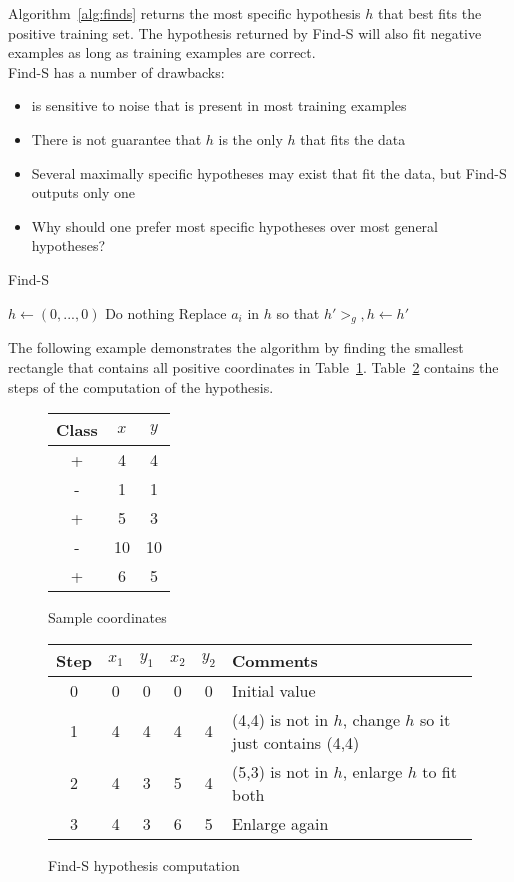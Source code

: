 \documentclass{report}
\begin{document}
Algorithm~\ref{alg:finds} returns the most specific hypothesis $h$ that best fits the positive training set. The hypothesis returned by Find-S will also fit negative examples as long as training examples are correct.
\\
Find-S has a number of drawbacks:
\begin{itemize}
\item is sensitive to noise that is present in most training examples
\item There is not guarantee that $h$ is the only $h$ that fits the data
\item Several maximally specific hypotheses may exist that fit the data, but Find-S outputs only one
\item Why should one prefer most specific hypotheses over most general hypotheses?
\end{itemize}

\begin{algorithm}
\caption{Find-S}
\label{alg:finds}
\begin{algorithmic}
\State $h \gets (0,...,0)$ 
\State Do nothing
\Else
\State Replace $a_i$ in $h$ so that $h' >_g, h\gets h'$
\EndIf
\EndFor
\EndFor
\\
\end{algorithmic}
\end{algorithm}

The following example demonstrates the algorithm by finding the smallest rectangle that contains all positive coordinates in Table~\ref{table:coordinates}. Table~\ref{table:findscomputation} contains the steps of the computation of the hypothesis.

\begin{figure}[h!]
\centering
\begin{tabular}{c||c|c}
Class & $x$ & $y$ \\
\hline
\hline
+ & 4 & 4 \\
- & 1 & 1 \\
+ & 5 & 3 \\
- & 10 & 10 \\
+ & 6 & 5
\end{tabular}
\caption{Sample coordinates}
\label{table:coordinates}
\end{figure}


\begin{figure}[h!]
\centering
\begin{tabular}{c||c|c|c|c||l}
Step & $x_1$ & $y_1$ & $x_2$ & $y_2$ & Comments \\
\hline
\hline
0 & 0 & 0 & 0 & 0 & Initial value \\
1 & 4 & 4 & 4 & 4 & (4,4) is not in $h$, change $h$ so it just contains (4,4) \\
2 & 4 & 3 & 5 & 4 & (5,3) is not in $h$, enlarge $h$ to fit both \\
3 & 4 & 3 & 6 & 5 &  Enlarge again
\end{tabular}
\caption{Find-S hypothesis computation}
\label{table:findscomputation}
\end{figure}
\end{document}
